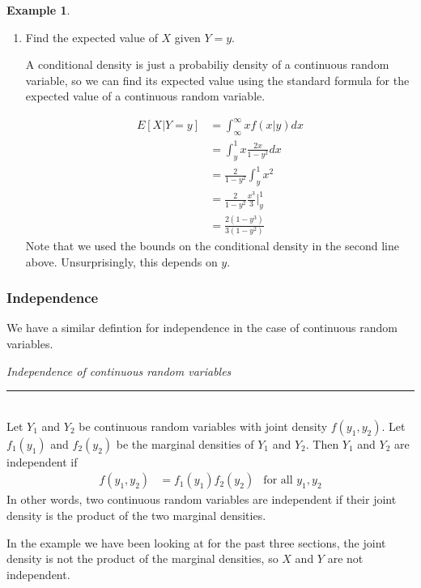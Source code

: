 \documentclass[12pt]{article}
\theoremstyle{definition}
\newtheorem*{example}{Example}
\theoremstyle{remark}
\begin{document}
\begin{example}
\begin{enumerate}
\item Find the expected value of $X$ given $Y = y$.

A conditional density is just a probabiliy density of a continuous random variable, so we can find its expected value using the standard formula for the expected value of a continuous random variable.

\begin{align*}
E[X|Y = y] &= \int_{\infty}^{\infty} xf(x|y)dx\\
&= \int_y^1 x \frac{2x}{1 - y^2} dx \\
&= \frac{2}{1 - y^2} \int_y^1 x^2 \\
&= \frac{2}{1 - y^2}\frac{x^3}{3}\Bigr|_y^1 \\
&= \frac{2(1 - y^3)}{3(1 - y^2)}
\end{align*}
Note that we used the bounds on the conditional density in the second line above. Unsurprisingly, this depends on $y$.

\end{enumerate}
\end{example}

\subsubsection{Independence}
We have a similar defintion for independence in the case of continuous random variables.\\

\begin{framed}
\emph{Independence of continuous random variables}\\
  \rule{\dimexpr{}\fboxrule}{.1pt} \\
Let $Y_1$ and $Y_2$ be continuous random variables with joint density $f(y_1, y_2)$. Let $f_1(y_1)$ and $f_2(y_2)$ be the marginal densities of $Y_1$ and $Y_2$. Then $Y_1$ and $Y_2$ are independent if
\begin{align*}
f(y_1, y_2) &= f_1(y_1)f_2(y_2) & \text{for all }y_1, y_2
\end{align*}
In other words, two continuous random variables are independent if their joint density is the product of the two marginal densities.
\end{framed}

In the example we have been looking at for the past three sections, the joint density is not the product of the marginal densities, so $X$ and $Y$ are not independent.
\end{document}
